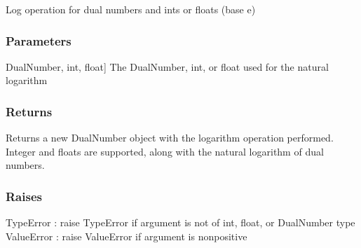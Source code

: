 \documentclass[letterpaper,10pt,english]{sphinxmanual}
\begin{document}
\begin{fulllineitems}
\label{\detokenize{autodiff:autodiff.operators.log}}
\pysigstartsignatures
{}
\pysigstopsignatures
\sphinxAtStartPar
Log operation for dual numbers and ints or floats (base e)


\subsubsection{Parameters}
\label{\detokenize{autodiff:id24}}\begin{description}
\sphinxlineitem{x}{[}DualNumber, int, float{]}
\sphinxAtStartPar
The DualNumber, int, or float used for the natural logarithm

\end{description}


\subsubsection{Returns}
\label{\detokenize{autodiff:id25}}\begin{description}
\sphinxAtStartPar
Returns a new DualNumber object with the logarithm operation performed. Integer and
floats are supported, along with the natural logarithm of dual numbers.

\end{description}


\subsubsection{Raises}
\label{\detokenize{autodiff:id26}}
\sphinxAtStartPar
TypeError : raise TypeError if argument is not of int, float, or DualNumber type
ValueError : raise ValueError if argument is nonpositive

\end{fulllineitems}

\end{document}
